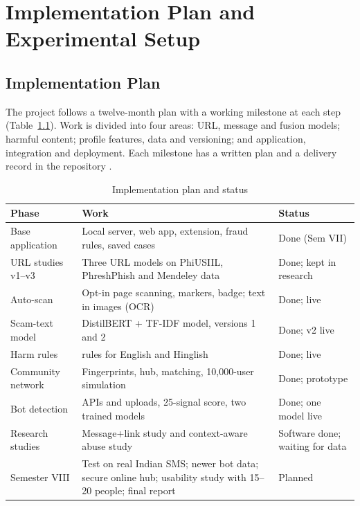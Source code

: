 \onehalfspacing
\pagestyle{fancy}
\fancyhf{}
\renewcommand{\headrulewidth}{0pt}
\cfoot{\thepage}
\chapter{Implementation Plan and Experimental Setup}

\section{Implementation Plan}
\noindent The project follows a twelve-month plan with a working milestone at each step (Table~\ref{tab:plan}). Work is divided into four areas: URL, message and fusion models; harmful content; profile features, data and versioning; and application, integration and deployment. Each milestone has a written plan and a delivery record in the repository \cite{repo}.

\begin{table}[H]
\centering
\small
\renewcommand{\arraystretch}{1.15}
\caption{Implementation plan and status}
\label{tab:plan}
\begin{tabular}{|>{\raggedright\arraybackslash}p{2.8cm}|>{\raggedright\arraybackslash}p{8.6cm}|>{\raggedright\arraybackslash}p{2.9cm}|}
\hline
\textbf{Phase} & \textbf{Work} & \textbf{Status} \\ \hline
Base application & Local server, web app, extension, fraud rules, saved cases & Done (Sem VII) \\ \hline
URL studies v1--v3 & Three URL models on PhiUSIIL, PhreshPhish and Mendeley data & Done; kept in research \\ \hline
Auto-scan & Opt-in page scanning, markers, badge; text in images (OCR) & Done; live \\ \hline
Scam-text model & DistilBERT + TF-IDF model, versions 1 and 2 & Done; v2 live \\ \hline
Harm rules & 19 rules for English and Hinglish & Done; live \\ \hline
Community network & Fingerprints, hub, matching, 10,000-user simulation & Done; prototype \\ \hline
Bot detection & APIs and uploads, 25-signal score, two trained models & Done; one model live \\ \hline
Research studies & Message+link study and context-aware abuse study & Software done; waiting for data \\ \hline
Semester VIII & Test on real Indian SMS; newer bot data; secure online hub; usability study with 15--20 people; final report & Planned \\ \hline
\end{tabular}
\end{table}

